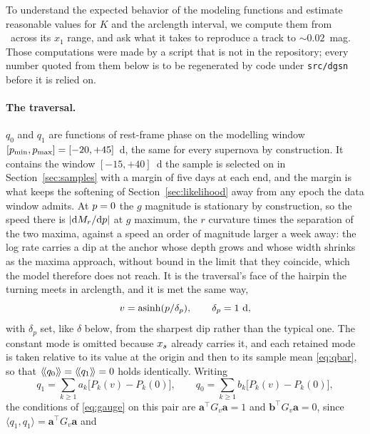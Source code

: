 \documentclass[11pt]{article}
\theoremstyle{plain}
\begin{document}
To understand the expected behavior of the modeling functions
and estimate reasonable values for $K$ and the arclength interval, we compute them from \salt\
across its $x_{1}$ range, and ask what it takes to reproduce a track to $\sim 0.02$~mag.
Those computations were made by a script that is not in the repository; every number quoted
from them below is to be regenerated by code under \texttt{src/dgsn} before it is relied on.

\paragraph{The traversal.} $q_{0}$ and $q_{1}$ are functions of rest-frame phase on the
modelling window $[p_{\min}, p_{\max}] = [-20, +45]$~d, the same for every
supernova by construction. It contains the window $[-15, +40]$~d the sample is selected on
in Section~\ref{sec:samples} with a margin of five days at each end, and the margin is what
keeps the softening of Section~\ref{sec:likelihood} away from any epoch the data window
admits. At $p = 0$ the $g$ magnitude is stationary by construction, so the speed there
is $|\mathrm{d}M_{r}/\mathrm{d}p|$ at $g$ maximum, the $r$ curvature times the separation of the two
maxima, against a speed an order of magnitude larger a week away: the log rate carries a dip
at the anchor whose depth grows and whose width shrinks as the maxima approach, without
bound in the limit that they coincide, which the model therefore does not reach. It is the
traversal's face of the hairpin the turning meets in arclength, and it is met the same way,
\begin{equation}
  v = \operatorname{asinh}(p/\delta_{p}), \qquad \delta_{p} = 1~\mathrm{d},
  \label{eq:vmap}
\end{equation}
with $\delta_{p}$ set, like $\delta$ below, from the sharpest dip rather than the typical
one. The constant mode is omitted because $x_{s}$
already carries it, and each retained mode is taken relative to its value at the origin and
then to its sample mean \eqref{eq:qbar}, so that $\left\langle\!\left\langle q_{0} \right\rangle\!\right\rangle = \left\langle\!\left\langle q_{1} \right\rangle\!\right\rangle = 0$ holds
identically. Writing
\begin{equation}
  q_{1} = \sum_{k \geq 1} a_{k}\bigl[P_{k}(v) - P_{k}(0)\bigr], \qquad
  q_{0} = \sum_{k \geq 1} b_{k}\bigl[P_{k}(v) - P_{k}(0)\bigr],
  \label{eq:basisq}
\end{equation}
the conditions of \eqref{eq:gauge} on this pair are
$\mathbf{a}^{\top}G_{v}\mathbf{a} = 1$ and $\mathbf{b}^{\top}G_{v}\mathbf{a} = 0$, since
$\langle q_{1}, q_{1}\rangle = \mathbf{a}^{\top}G_{v}\mathbf{a}$ and
\end{document}
